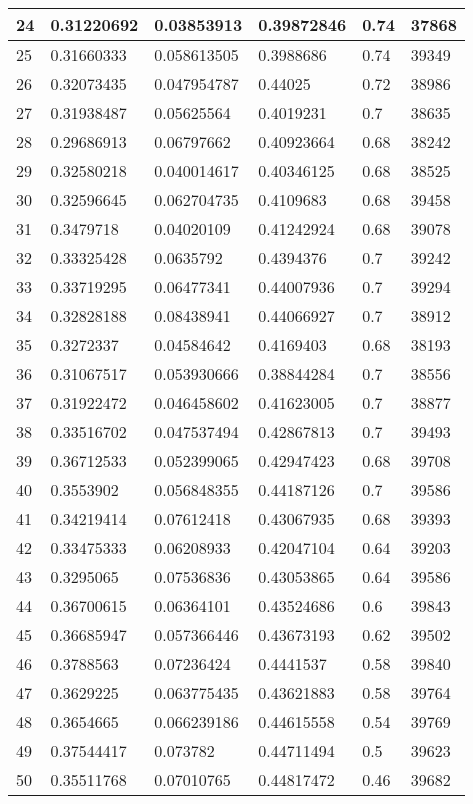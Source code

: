 \begin{longtable}{|l|l|l|l|l|l|}
24 & 0.31220692 & 0.03853913 & 0.39872846 & 0.74 & 37868 \\ \hline 
25 & 0.31660333 & 0.058613505 & 0.3988686 & 0.74 & 39349 \\ \hline 
26 & 0.32073435 & 0.047954787 & 0.44025 & 0.72 & 38986 \\ \hline 
27 & 0.31938487 & 0.05625564 & 0.4019231 & 0.7 & 38635 \\ \hline 
28 & 0.29686913 & 0.06797662 & 0.40923664 & 0.68 & 38242 \\ \hline 
29 & 0.32580218 & 0.040014617 & 0.40346125 & 0.68 & 38525 \\ \hline 
30 & 0.32596645 & 0.062704735 & 0.4109683 & 0.68 & 39458 \\ \hline 
31 & 0.3479718 & 0.04020109 & 0.41242924 & 0.68 & 39078 \\ \hline 
32 & 0.33325428 & 0.0635792 & 0.4394376 & 0.7 & 39242 \\ \hline 
33 & 0.33719295 & 0.06477341 & 0.44007936 & 0.7 & 39294 \\ \hline 
34 & 0.32828188 & 0.08438941 & 0.44066927 & 0.7 & 38912 \\ \hline 
35 & 0.3272337 & 0.04584642 & 0.4169403 & 0.68 & 38193 \\ \hline 
36 & 0.31067517 & 0.053930666 & 0.38844284 & 0.7 & 38556 \\ \hline 
37 & 0.31922472 & 0.046458602 & 0.41623005 & 0.7 & 38877 \\ \hline 
38 & 0.33516702 & 0.047537494 & 0.42867813 & 0.7 & 39493 \\ \hline 
39 & 0.36712533 & 0.052399065 & 0.42947423 & 0.68 & 39708 \\ \hline 
40 & 0.3553902 & 0.056848355 & 0.44187126 & 0.7 & 39586 \\ \hline 
41 & 0.34219414 & 0.07612418 & 0.43067935 & 0.68 & 39393 \\ \hline 
42 & 0.33475333 & 0.06208933 & 0.42047104 & 0.64 & 39203 \\ \hline 
43 & 0.3295065 & 0.07536836 & 0.43053865 & 0.64 & 39586 \\ \hline 
44 & 0.36700615 & 0.06364101 & 0.43524686 & 0.6 & 39843 \\ \hline 
45 & 0.36685947 & 0.057366446 & 0.43673193 & 0.62 & 39502 \\ \hline 
46 & 0.3788563 & 0.07236424 & 0.4441537 & 0.58 & 39840 \\ \hline 
47 & 0.3629225 & 0.063775435 & 0.43621883 & 0.58 & 39764 \\ \hline 
48 & 0.3654665 & 0.066239186 & 0.44615558 & 0.54 & 39769 \\ \hline 
49 & 0.37544417 & 0.073782 & 0.44711494 & 0.5 & 39623 \\ \hline 
50 & 0.35511768 & 0.07010765 & 0.44817472 & 0.46 & 39682 \\ \hline 
\end{longtable}